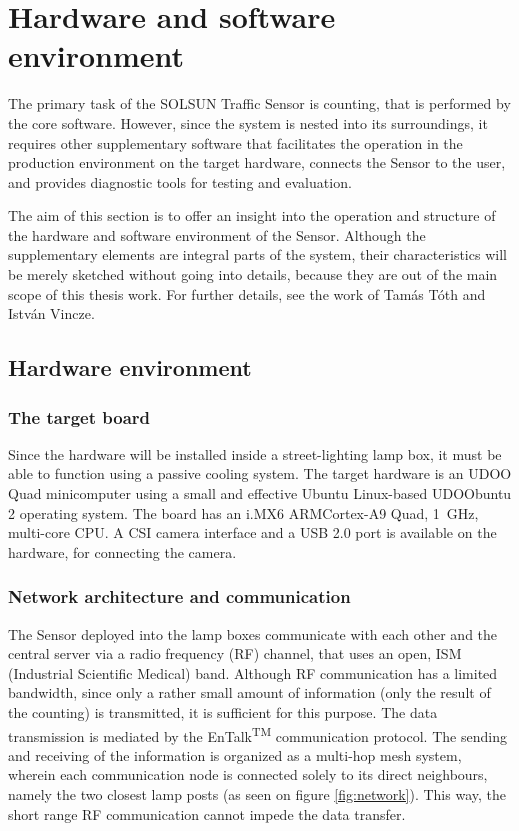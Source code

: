 \chapter{Hardware and software environment}\label{chap:Environment}
The primary task of the SOLSUN Traffic Sensor is counting, that is performed by the core software.
However, since the system is nested into its surroundings, it requires other supplementary software that facilitates the operation in the production environment on the target hardware, connects the Sensor to the user, and provides diagnostic tools for testing and evaluation.

The aim of this section is to offer an insight into the operation and structure of the hardware and software environment of the Sensor.
Although the supplementary elements are integral parts of the system, their characteristics will be merely sketched without going into details, because they are out of the main scope of this thesis work.
For further details, see the work of Tam{\'a}s T{\'o}th\cite{Toth2016} and Istv{\'a}n Vincze\cite{Vincze2016}.
\section{Hardware environment}
\subsection{The target board}
Since the hardware will be installed inside a street-lighting lamp box, it must be able to function using a passive cooling system.
The target hardware is an UDOO Quad minicomputer using a small and effective Ubuntu Linux-based UDOObuntu 2 operating system.
The board has an i.MX6 ARM\reg Cortex\reg-A9 Quad, \SI{1}{GHz}, multi-core CPU\cite{UDOO, UDOO2}.
A CSI camera interface and a USB 2.0 port is available on the hardware, for connecting the camera.

\subsection{Network architecture and communication}
The Sensor deployed into the lamp boxes communicate with each other and the central server via a radio frequency (RF) channel, that uses an open, ISM (Industrial Scientific Medical) band.
Although RF communication has a limited bandwidth, since only a rather small amount of information (only the result of the counting) is transmitted, it is sufficient for this purpose.
The data transmission is mediated by the EnTalk\textsuperscript{TM} communication protocol\cite{EnTalk}.
The sending and receiving of the information is organized as a multi-hop mesh system, wherein each communication node is connected solely to its direct neighbours, namely the two closest lamp posts (as seen on figure \ref{fig:network}).
This way, the short range RF communication cannot impede the data transfer.

